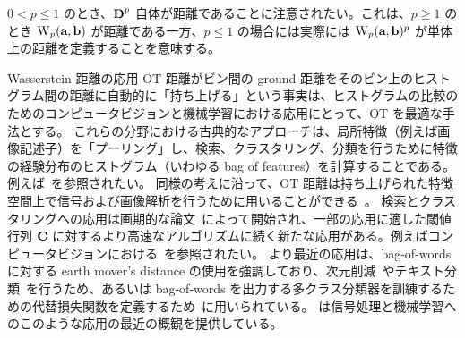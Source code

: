 \begin{rem}
$0 < p \leq 1$ のとき、$\mathrm{\textbf{D}}^p$ 自体が距離であることに注意されたい。これは、$p\geq 1$ のとき $\operatorname{\mathrm{W}}_p(\mathrm{\textbf{a}},\mathrm{\textbf{b}})$ が距離である一方、$p \leq 1$ の場合には実際には $\operatorname{\mathrm{W}}_p(\mathrm{\textbf{a}},\mathrm{\textbf{b}})^p$ が単体上の距離を定義することを意味する。
\end{rem}


\begin{rem1}{Wasserstein 距離の応用}
OT 距離がビン間の ground 距離をそのビン上のヒストグラム間の距離に自動的に「持ち上げる」という事実は、ヒストグラムの比較のためのコンピュータビジョンと機械学習における応用にとって、OT を最適な手法とする。
%
これらの分野における古典的なアプローチは、局所特徴（例えば画像記述子）を「プーリング」し、検索、クラスタリング、分類を行うために特徴の経験分布のヒストグラム（いわゆる bag of features）を計算することである。例えば~\citep{oliva2001modeling}を参照されたい。
%
同様の考えに沿って、OT 距離は持ち上げられた特徴空間上で信号および画像解析を行うために用いることができる~\citep{thorpe2017transportation}。
%
検索とクラスタリングへの応用は画期的な論文~\citep{RubTomGui00}によって開始され、一部の応用に適した閾値行列 $\mathrm{\textbf{C}}$ に対するより高速なアルゴリズムに続く新たな応用がある。例えばコンピュータビジョンにおける~\citep{pele2008linear,Pele-iccv2009}を参照されたい。
%
より最近の応用は、bag-of-words に対する earth mover's distance の使用を強調しており、次元削減~\citep{pmlr-v51-rolet16}やテキスト分類~\citep{kusner2015word,huang2016supervised}を行うため、あるいは bag-of-words を出力する多クラス分類器を訓練するための代替損失関数を定義するため~\citep{FrognerNIPS}に用いられている。
%
\citet{kolouri2017optimal}は信号処理と機械学習へのこのような応用の最近の概観を提供している。
\end{rem1}





